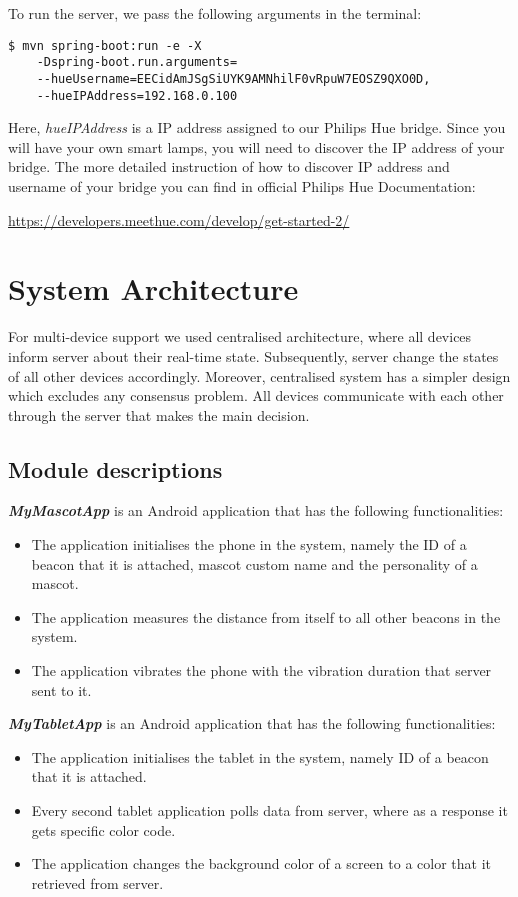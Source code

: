\noindent To run the server, we pass the following arguments in the terminal:
\begin{lstlisting}[frame=single]
    $ mvn spring-boot:run -e -X
    -Dspring-boot.run.arguments=
    --hueUsername=EECidAmJSgSiUYK9AMNhilF0vRpuW7EOSZ9QXO0D,
    --hueIPAddress=192.168.0.100
\end{lstlisting}

Here, \emph{hueIPAddress} is a IP address assigned to our Philips Hue bridge.
Since you will have your own smart lamps, you will need to discover the IP address of your bridge.
The more detailed instruction of how to discover IP address and username of your bridge you can
find in official Philips Hue Documentation:

\url{https://developers.meethue.com/develop/get-started-2/}

\section{System Architecture}
\label{sec:system-architecture}
For multi-device support we used centralised architecture, where all devices inform server about their real-time state.
Subsequently, server change the states of all other devices accordingly.
Moreover, centralised system has a simpler design which excludes any consensus problem.
All devices communicate with each other through the server that makes the main decision.

\subsection{Module descriptions}
\label{subsec:module-descriptions}
\textbf{\emph{MyMascotApp}} is an Android application that has the following functionalities:
\begin{itemize}
    \item The application initialises the phone in the system, namely the ID of a beacon that it is attached,
        mascot custom name and the personality of a mascot.
    \item The application measures the distance from itself to all other beacons in the system.
    \item The application vibrates the phone with the vibration duration that server sent to it.
\end{itemize}

\textbf{\emph{MyTabletApp}} is an Android application that has the following functionalities:
\begin{itemize}
    \item The application initialises the tablet in the system, namely ID of a beacon that it is attached.
    \item Every second tablet application polls data from server, where as a response it gets specific color code.
    \item The application changes the background color of a screen to a color that it retrieved from server.
\end{itemize}

